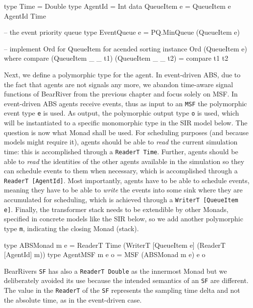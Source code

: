 \begin{HaskellCode}
type Time        = Double
type AgentId     = Int
data QueueItem e = QueueItem e AgentId Time

-- the event priority queue
type EventQueue e = PQ.MinQueue (QueueItem e)

-- implement Ord for QueueItem for acended sorting
instance Ord (QueueItem e) where
  compare (QueueItem _ _ t1) (QueueItem _ _ t2) = compare t1 t2
\end{HaskellCode}

Next, we define a polymorphic type for the agent. In event-driven ABS, due to the fact that agents are not signals any more, we abandon time-aware signal functions of BearRiver from the previous chapter and focus solely on MSF. In event-driven ABS agents receive events, thus as input to an \texttt{MSF} the polymorphic event type \texttt{e} is used. As output, the polymorphic output type \texttt{o} is used, which will be instantiated to a specific monomorphic type in the SIR model below. The question is now what Monad shall be used. For scheduling purposes (and because models might require it), agents should be able to \textit{read} the current simulation time: this is accomplished through a \texttt{ReaderT Time}. Further, agents should be able to \textit{read} the identities of the other agents available in the simulation so they can schedule events to them when necessary, which is accomplished through a \texttt{ReaderT [AgentId]}. Most importantly, agents have to be able to schedule events, meaning they have to be able to \textit{write} the events into some sink where they are accumulated for scheduling, which is achieved through a \texttt{WriterT [QueueItem e]}. Finally, the transformer stack needs to be extendible by other Monads, specified in concrete models like the SIR below, so we add another polymorphic type \texttt{m}, indicating the closing Monad (stack).

\begin{HaskellCode}
type ABSMonad m e   = ReaderT Time (WriterT [QueueItem e] (ReaderT [AgentId] m))
type AgentMSF m e o = MSF (ABSMonad m e) e o
\end{HaskellCode}

BearRivers \texttt{SF} has also a \texttt{ReaderT Double} as the innermost Monad but we deliberately avoided its use because the intended semantics of an \texttt{SF} are different. The value in the \texttt{ReaderT} of the \texttt{SF} represents the sampling time delta and not the absolute time, as in the event-driven case.

